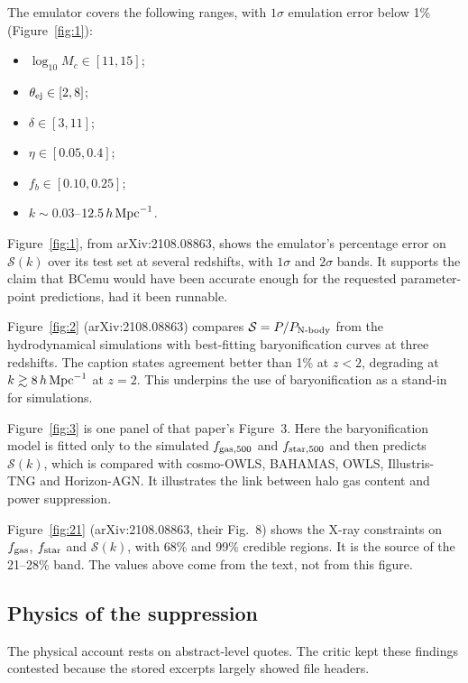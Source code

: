 \documentclass[11pt,a4paper]{article}
\begin{document}
The emulator covers the following ranges, with $1\sigma$ emulation error below 1\% (Figure~\ref{fig:1}):
\begin{itemize}
\item $\log_{10}M_c\in[11,15]$;
\item $\theta_{\rm ej}\in[2,8]$;
\item $\delta\in[3,11]$;
\item $\eta\in[0.05,0.4]$;
\item $f_b\in[0.10,0.25]$;
\item $k\sim0.03$--$12.5\,h\,{\rm Mpc}^{-1}$.
\end{itemize}






Figure~\ref{fig:1}, from arXiv:2108.08863, shows the emulator's percentage error on $\mathcal{S}(k)$ over its test set at several redshifts, with $1\sigma$ and $2\sigma$ bands. It supports the claim that BCemu would have been accurate enough for the requested parameter-point predictions, had it been runnable.






Figure~\ref{fig:2} (arXiv:2108.08863) compares $\mathcal{S}=P/P_{\rm N\text{-}body}$ from the hydrodynamical simulations with best-fitting baryonification curves at three redshifts. The caption states agreement better than 1\% at $z<2$, degrading at $k\gtrsim8\,h\,{\rm Mpc}^{-1}$ at $z=2$. This underpins the use of baryonification as a stand-in for simulations.






Figure~\ref{fig:3} is one panel of that paper's Figure~3. Here the baryonification model is fitted only to the simulated $f_{\rm gas,500}$ and $f_{\rm star,500}$ and then predicts $\mathcal{S}(k)$, which is compared with cosmo-OWLS, BAHAMAS, OWLS, Illustris-TNG and Horizon-AGN. It illustrates the link between halo gas content and power suppression.






Figure~\ref{fig:21} (arXiv:2108.08863, their Fig.~8) shows the X-ray constraints on $f_{\rm gas}$, $f_{\rm star}$ and $\mathcal{S}(k)$, with 68\% and 99\% credible regions. It is the source of the 21--28\% band. The values above come from the text, not from this figure.

\subsection{Physics of the suppression}
The physical account rests on abstract-level quotes. The critic kept these findings contested because the stored excerpts largely showed file headers.
\end{document}
